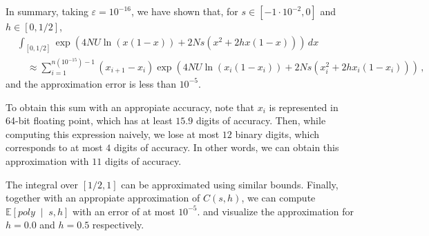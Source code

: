 \documentclass[a4paper,11pt]{article}
\newcommand{\EE}{\mathbb{E}}
\newcommand{\1}{\mathds{1}}
\newcommand{\eps}{\varepsilon}
\newcommand{\cond}{\;\middle\vert\;}
\theoremstyle{plain} %
\theoremstyle{definition} %
\theoremstyle{remark} %
\begin{document}
In summary, taking $\eps = 10^{-16}$, we have shown that, for $s \in [-1 \cdot 10^{-2}, 0]$ and $h \in [0, 1/2]$,
\begin{align*}
	&\int_{[0, 1/2]}  \exp( 4 N U \ln(x (1-x)) + 2 N s ( x^2 + 2h x(1-x)) ) \, dx \\
	&\quad
	\approx \sum_{i = 1}^{n(10^{-15}) - 1} (x_{i+1} - x_i) \exp( 4 N U \ln(x_i (1-x_i)) + 2 N s ( x_i^2 + 2h x_i (1 - x_i)) ) \,,
\end{align*}
and the approximation error is less than $10^{-5}$.

To obtain this sum with an appropiate accuracy, note that $x_i$ is represented in 64-bit floating point, which has at least $15.9$ digits of accuracy. 
Then, while computing this expression naively, we lose at most $12$ binary digits, which corresponds to at most $4$ digits of accuracy.
In other words, we can obtain this approximation with $11$ digits of accuracy. 

The integral over $[1/2, 1]$ can be approximated using similar bounds.
Finally, together with an appropiate approximation of $C(s, h)$, we can compute $\EE \left[ poly \cond s, h \right]$ with an error of at most $10^{-5}$.
 and  visualize the approximation for $h = 0.0$ and $h = 0.5$ respectively.
\end{document}

